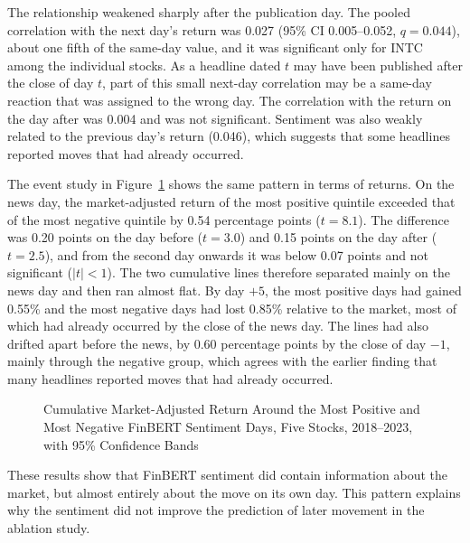 The relationship weakened sharply after the publication day. The pooled correlation with the next day's return was 0.027 (95\% CI 0.005--0.052, $q = 0.044$), about one fifth of the same-day value, and it was significant only for INTC among the individual stocks. As a headline dated $t$ may have been published after the close of day $t$, part of this small next-day correlation may be a same-day reaction that was assigned to the wrong day. The correlation with the return on the day after was 0.004 and was not significant. Sentiment was also weakly related to the previous day's return (0.046), which suggests that some headlines reported moves that had already occurred.

The event study in Figure~\ref{fig:event-study} shows the same pattern in terms of returns. On the news day, the market-adjusted return of the most positive quintile exceeded that of the most negative quintile by 0.54 percentage points ($t = 8.1$). The difference was 0.20 points on the day before ($t = 3.0$) and 0.15 points on the day after ($t = 2.5$), and from the second day onwards it was below 0.07 points and not significant ($|t| < 1$). The two cumulative lines therefore separated mainly on the news day and then ran almost flat. By day $+5$, the most positive days had gained 0.55\% and the most negative days had lost 0.85\% relative to the market, most of which had already occurred by the close of the news day. The lines had also drifted apart before the news, by 0.60 percentage points by the close of day $-1$, mainly through the negative group, which agrees with the earlier finding that many headlines reported moves that had already occurred.

\begin{figure}[htbp]
\centering
{}
\caption[Cumulative Market-Adjusted Return Around Extreme Sentiment Days]{Cumulative Market-Adjusted Return Around the Most Positive and Most Negative FinBERT Sentiment Days, Five Stocks, 2018--2023, with 95\% Confidence Bands}
\label{fig:event-study}
\end{figure}

These results show that FinBERT sentiment did contain information about the market, but almost entirely about the move on its own day. This pattern explains why the sentiment did not improve the prediction of later movement in the ablation study.

